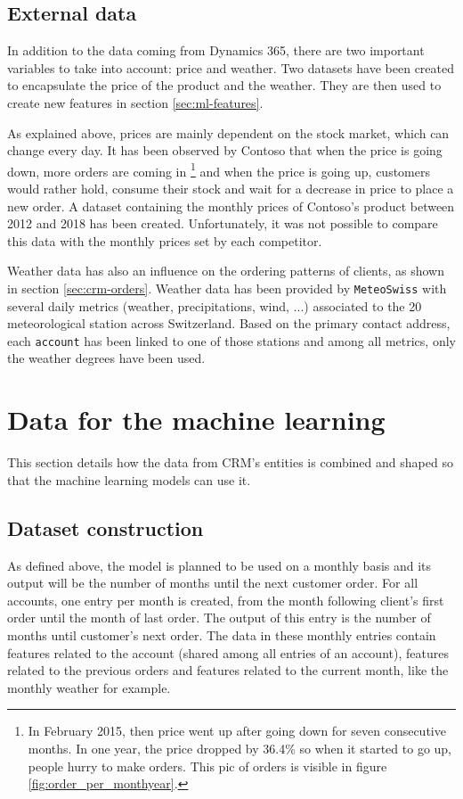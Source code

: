 \subsection{External data}\label{sec:external-data}
In addition to the data coming from Dynamics 365, there are two important variables to take into account: price and weather. Two datasets have been created to encapsulate the price of the product and the weather. They are then used to create new features in section \ref{sec:ml-features}.

As explained above, prices are mainly dependent on the stock market, which can change every day. It has been observed by Contoso that when the price is going down, more orders are coming in \footnote{In February 2015, then price went up after going down for seven consecutive months. In one year, the price dropped by 36.4\% so when it started to go up, people hurry to make orders. This pic of orders is visible in figure \ref{fig:order_per_monthyear}.} and when the price is going up, customers would rather hold, consume their stock and wait for a decrease in price to place a new order. A dataset containing the monthly prices of Contoso's product between 2012 and 2018 has been created. Unfortunately, it was not possible to compare this data with the monthly prices set by each competitor.

Weather data has also an influence on the ordering patterns of clients, as shown in section \ref{sec:crm-orders}. Weather data has been provided by \texttt{MeteoSwiss} with several daily metrics (weather, precipitations, wind, ...) associated to the 20 meteorological station across Switzerland. Based on the primary contact address, each \texttt{account} has been linked to one of those stations and among all metrics, only the weather degrees \big[°C\big] have been used.


\section{Data for the machine learning}\label{sec:datta-for-the-ml}
This section details how the data from CRM's entities is combined and shaped so that the machine learning models can use it.


\subsection{Dataset construction}\label{sec:data-shape-for-ml}
As defined above, the model is planned to be used on a monthly basis and its output will be the number of months until the next customer order. For all accounts, one entry per month is created, from the month following client's first order until the month of last order. The output of this entry is the number of months until customer's next order. The data in these monthly entries contain features related to the account (shared among all entries of an account), features related to the previous orders and features related to the current month, like the monthly weather for example. 

